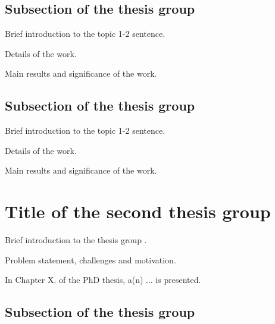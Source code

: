 \documentclass[12pt,a4paper]{extarticle}
\begin{document}
\subsection{Subsection of the thesis group}


Brief introduction to the topic 1-2 sentence.

Details of the work.

Main results and significance of the work.

\subsection{Subsection of the thesis group}


Brief introduction to the topic 1-2 sentence.

Details of the work.

Main results and significance of the work.

\section{Title of the second thesis group}

Brief introduction to the thesis group \cite{b:mays01}.

Problem statement, challenges and motivation.

In Chapter X. of the PhD thesis, a(n) ... is presented.

\subsection{Subsection of the thesis group}

\end{document}
